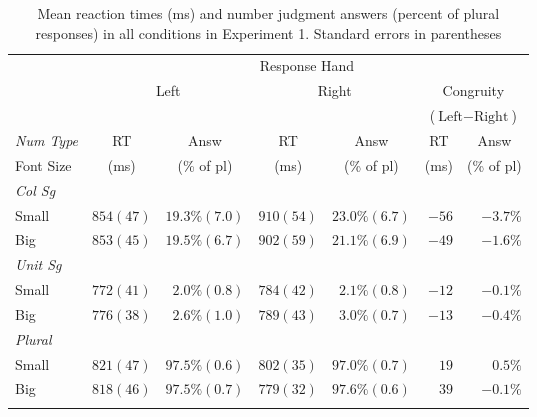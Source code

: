 \documentclass[output=paper]{langscibook}
\begin{document}
\begin{table}[H]
\caption{Mean reaction times (ms) and number judgment answers (percent of plural responses) in all conditions in Experiment 1. Standard errors in parentheses}
\label{gul-bla:tab:reaction-times-exp1}
\begin{tabularx}{\textwidth}{X r@{~~~}r r@{~~~}r r@{~~~}r}
\lsptoprule
&\multicolumn{6}{c}{Response Hand}\\\cmidrule(lr){2-7}
&\multicolumn{2}{c}{\multirow{2}{*}{Left}}&\multicolumn{2}{c}{\multirow{2}{*}{Right}}&\multicolumn{2}{c}{Congruity}\\
&&&&&\multicolumn{2}{c}{($\text{Left}-\text{Right}$)}\\\cmidrule(lr){2-3}\cmidrule(lr){4-5}\cmidrule(lr){6-7}
\textit{Num Type}&\multicolumn{1}{c}{RT}&\multicolumn{1}{c}{Answ}&\multicolumn{1}{c}{RT}&\multicolumn{1}{c}{Answ}&\multicolumn{1}{c}{RT}&\multicolumn{1}{c}{Answ}\\
\hspace{6pt}Font Size&\multicolumn{1}{c}{(ms)}&\multicolumn{1}{c}{(\% of pl)}&\multicolumn{1}{c}{(ms)}&\multicolumn{1}{c}{(\% of pl)}&\multicolumn{1}{c}{(ms)}&\multicolumn{1}{c}{(\% of pl)}\\\midrule
\textit{Col Sg}\\
\hspace{6pt}Small& $854 (47)$& $19.3\% (7.0)$& $910 (54)$& $23.0\% (6.7)$& $-56$& $-3.7\%$\\
\hspace{6pt}Big& $853 (45)$& $19.5\% (6.7)$& $902 (59)$& $21.1\% (6.9)$& $-49$& $-1.6\%$\\\tablevspace
\textit{Unit Sg}\\
\hspace{6pt}Small& $772 (41)$& $2.0\% (0.8)$& $784 (42)$& $2.1\% (0.8)$& $-12$& $-0.1\%$\\
\hspace{6pt}Big& $776 (38)$& $2.6\% (1.0)$& $789 (43)$& $3.0\% (0.7)$& $-13$& $-0.4\%$\\\tablevspace
\textit{Plural}\\
\hspace{6pt}Small& $821 (47)$& $97.5\% (0.6)$& $802 (35)$& $97.0\% (0.7)$& $19$& $0.5\%$\\
\hspace{6pt}Big& $818 (46)$& $97.5\% (0.7)$& $779 (32)$& $97.6\% (0.6)$& $39$& $-0.1\%$ \\
\lspbottomrule
\end{tabularx}
\end{table}
\end{document}
